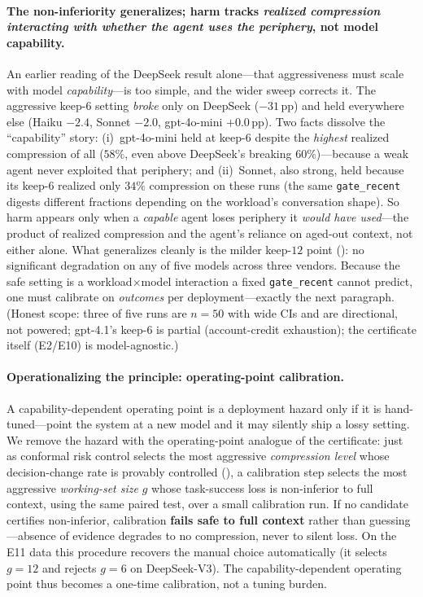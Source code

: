 \documentclass[11pt]{article}
\begin{document}
\paragraph{The non-inferiority generalizes; harm tracks \emph{realized compression interacting
with whether the agent uses the periphery}, not model capability.} An earlier reading of the
DeepSeek result alone---that aggressiveness must scale with model \emph{capability}---is too
simple, and the wider sweep corrects it. The aggressive keep-$6$ setting \emph{broke} only on
DeepSeek ($-31$\,pp) and held everywhere else (Haiku $-2.4$, Sonnet $-2.0$, gpt-4o-mini
$+0.0$\,pp). Two facts dissolve the ``capability'' story: (i)~gpt-4o-mini held at keep-$6$
despite the \emph{highest} realized compression of all ($58\%$, even above DeepSeek's breaking
$60\%$)---because a weak agent never exploited that periphery; and (ii)~Sonnet, also strong,
held because its keep-$6$ realized only $34\%$ compression on these runs (the same
\texttt{gate\_recent} digests different fractions depending on the workload's conversation
shape). So harm appears only when a \emph{capable} agent loses periphery it \emph{would have
used}---the product of realized compression and the agent's reliance on aged-out context, not
either alone. What generalizes cleanly is the milder keep-$12$ point ():
no significant degradation on any of five models across three vendors. Because the safe setting
is a workload$\times$model interaction a fixed \texttt{gate\_recent} cannot predict, one must
calibrate on \emph{outcomes} per deployment---exactly the next paragraph. (Honest scope: three
of five runs are $n{=}50$ with wide CIs and are directional, not powered; gpt-4.1's keep-$6$ is
partial (account-credit exhaustion); the certificate itself (E2/E10) is model-agnostic.)

\paragraph{Operationalizing the principle: operating-point calibration.}
A capability-dependent operating point is a deployment hazard only if it is hand-tuned---point
the system at a new model and it may silently ship a lossy setting. We remove the hazard with
the operating-point analogue of the certificate: just as conformal risk control selects the
most aggressive \emph{compression level} whose decision-change rate is provably controlled
(), a calibration step selects the most aggressive \emph{working-set size}
$g$ whose task-success loss is non-inferior to full context, using the same paired test, over
a small calibration run. If no candidate certifies non-inferior, calibration \textbf{fails
safe to full context} rather than guessing---absence of evidence degrades to no compression,
never to silent loss. On the E11 data this procedure recovers the manual choice automatically
(it selects $g{=}12$ and rejects $g{=}6$ on DeepSeek-V3). The capability-dependent operating
point thus becomes a one-time calibration, not a tuning burden.
\end{document}
